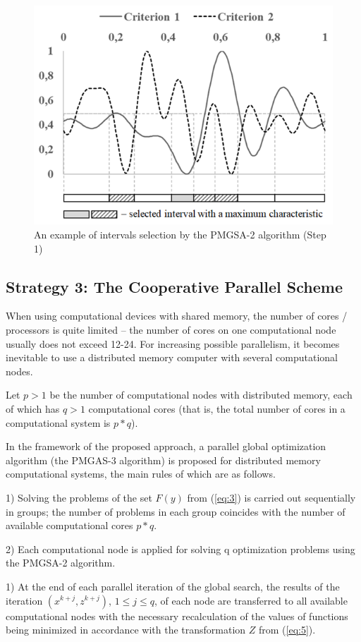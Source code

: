 \documentclass[review]{elsarticle}
\begin{document}
\begin{figure}
  \centering
  \includegraphics[width=0.7\linewidth]{fig3}
  \caption{An example of intervals selection by the PMGSA-2 algorithm (Step 1)}
  \label{fig:3}
\end{figure}

\subsection{Strategy 3: The Cooperative Parallel Scheme} \label{subsec:3}

When using computational devices with shared memory, the number of cores / processors is quite limited -- the number of cores on one computational node usually does not exceed 12-24. For increasing possible parallelism, it becomes inevitable to use a distributed memory computer with several computational nodes.

Let $p>1$ be the number of computational nodes with distributed memory, each of which has $q>1$ computational cores (that is, the total number of cores in a computational system is $p*q$). 

In the framework of the proposed approach, a parallel global optimization algorithm (the PMGAS-3 algorithm) is proposed for distributed memory computational systems, the main rules of which are as follows.


1) Solving the problems of the set $F(y)$ from (\ref{eq:3}) is carried out sequentially in groups; the number of problems in each group coincides with the number of available computational cores $p*q$.

2) Each computational node is applied for solving q optimization problems using the PMGSA-2 algorithm.

1) At the end of each parallel iteration of the global search, the results of the iteration $(x^{k+j},z^{k+j} )$, $1 \leq j \leq q$, of each node are transferred to all available computational nodes with the necessary recalculation of the values of functions being minimized in accordance with the transformation $Z$ from (\ref{eq:5}).
\end{document}

